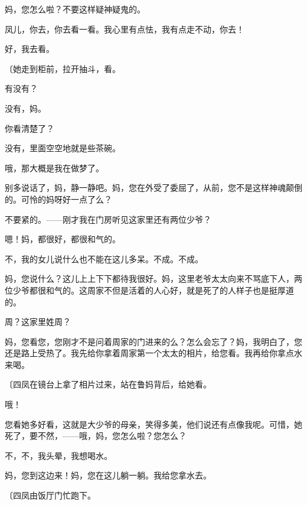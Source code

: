 妈，您怎么啦？不要这样疑神疑鬼的。

凤儿，你去，你去看一看。我心里有点怯，我有点走不动，你去！

好，我去看。

{\fangsong〔她走到柜前，拉开抽斗，看。}

有没有？

没有，妈。

你看清楚了？

没有，里面空空地就是些茶碗。

哦，那大概是我在做梦了。

别多说话了，妈，静一静吧。妈，您在外受了委屈了，从前，您不是这样神魂颠倒的。可怜的妈呀好一点了么？

不要紧的。——刚才我在门房听见这家里还有两位少爷？

嗯！妈，都很好，都很和气的。

不，我的女儿说什么也不能在这儿多呆。不成。不成。

妈，您说什么？这儿上上下下都待我很好。妈，这里老爷太太向来不骂底下人，两位少爷都很和气的。这周家不但是活着的人心好，就是死了的人样子也是挺厚道的。

周？这家里姓周？

妈，您看您，您刚才不是问着周家的门进来的么？怎么会忘了？妈，我明白了，您还是路上受热了。我先给你拿着周家第一个太太的相片，给您看。我再给你拿点水来喝。

{\fangsong〔四凤在镜台上拿了相片过来，站在鲁妈背后，给她看。}

哦！

您看她多好看，这就是大少爷的母亲，笑得多美，他们说还有点像我呢。可惜，她死了，要不然，——哦，妈，您怎么啦？您怎么？

不，不，我头晕，我想喝水。

妈，您到这边来！妈，您在这儿躺一躺。我给您拿水去。

{\fangsong〔四凤由饭厅门忙跑下。}

